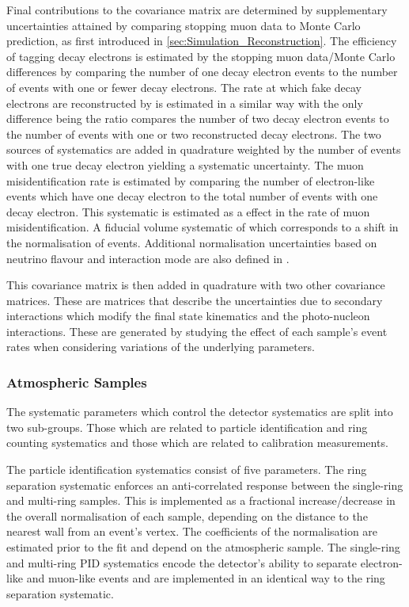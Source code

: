 Final contributions to the covariance matrix are determined by supplementary uncertainties attained by comparing stopping muon data to Monte Carlo prediction, as first introduced in \autoref{sec:Simulation_Reconstruction}. The efficiency of tagging decay electrons is estimated by the stopping muon data/Monte Carlo differences by comparing the number of one decay electron events to the number of events with one or fewer decay electrons. The rate at which fake decay electrons are reconstructed by \fq is estimated in a similar way with the only difference being the ratio compares the number of two decay electron events to the number of events with one or two reconstructed decay electrons. The two sources of systematics are added in quadrature weighted by the number of events with one true decay electron yielding a  systematic uncertainty. The muon misidentification rate is estimated by comparing the number of electron-like events which have one decay electron to the total number of events with one decay electron. This systematic is estimated as a  effect in the rate of muon misidentification. A fiducial volume systematic of  which corresponds to a  shift in the normalisation of events. Additional normalisation uncertainties based on neutrino flavour and interaction mode are also defined in \cite{t2k_tn_399, t2k_tn_186, t2k_tn_107}.

This covariance matrix is then added in quadrature with two other covariance matrices. These are matrices that describe the uncertainties due to secondary interactions which modify the final state kinematics and the photo-nucleon interactions. These are generated by studying the effect of each sample's event rates when considering variations of the underlying parameters.

\subsubsection{Atmospheric Samples}
\label{sec:SelsAndSysts_Systs_FDAtm}

The systematic parameters which control the detector systematics are split into two sub-groups. Those which are related to particle identification and ring counting systematics and those which are related to calibration measurements. 

The particle identification systematics consist of five parameters. The ring separation systematic enforces an anti-correlated response between the single-ring and multi-ring samples. This is implemented as a fractional increase/decrease in the overall normalisation of each sample, depending on the distance to the nearest wall from an event's vertex. The coefficients of the normalisation are estimated prior to the fit and depend on the atmospheric sample. The single-ring and multi-ring PID systematics encode the detector's ability to separate electron-like and muon-like events and are implemented in an identical way to the ring separation systematic.

